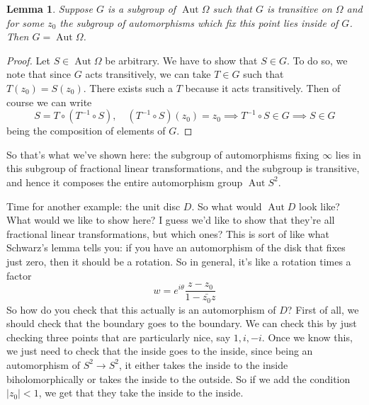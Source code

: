 \documentclass{article}
\newtheorem{lemma}{Lemma}
\DeclareMathOperator{\Aut}{Aut}
\begin{document}
\begin{lemma}
Suppose \(G\) is a subgroup of \(\Aut\Omega\) such that \(G\) is transitive on \(\Omega\) and for some \(z_0\) the subgroup of automorphisms which fix this point lies inside of \(G\). Then \(G = \Aut\Omega\).
\end{lemma}
\begin{proof}
Let \(S \in \Aut\Omega\) be arbitrary. We have to show that \(S \in G\). To do so, we note that since \(G\) acts transitively, we can take \(T \in G\) such that \(T(z_0) = S(z_0)\). There exists such a \(T\) because it acts transitively. Then of course we can write
\begin{equation}S = T \circ (T^{-1} \circ S), \quad (T^{-1} \circ S)(z_0) = z_0 \implies T^{-1} \circ S \in G \implies S \in G\end{equation}
being the composition of elements of \(G\).
\end{proof}
So that's what we've shown here: the subgroup of automorphisms fixing \(\infty\) lies in this subgroup of fractional linear transformations, and the subgroup is transitive, and hence it composes the entire automorphism group \(\Aut S^2\).

Time for another example: the unit disc \(D\). So what would \(\Aut D\) look like? What would we like to show here? I guess we'd like to show that they're all fractional linear transformations, but which ones? This is sort of like what Schwarz's lemma tells you: if you have an automorphism of the disk that fixes just zero, then it should be a rotation. So in general, it's like a rotation times a factor
\begin{equation}w = e^{i\theta}\frac{z - z_0}{1 - \bar{z_0}z}\end{equation}
So how do you check that this actually is an automorphism of \(D\)? First of all, we should check that the boundary goes to the boundary. We can check this by just checking three points that are particularly nice, say \(1, i, -i\). Once we know this, we just need to check that the inside goes to the inside, since being an automorphism of \(S^2 \to S^2\), it either takes the inside to the inside biholomorphically or takes the inside to the outside. So if we add the condition \(|z_0| < 1\), we get that they take the inside to the inside.
\end{document}
